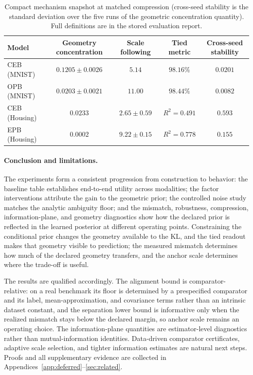 \begin{table}[t]
\centering\small
\setlength{\tabcolsep}{3pt}
\begin{tabular}{l c c c c}
\hline
Model & Geometry concentration & Scale following & Tied metric & Cross-seed stability \\
\hline
CEB (MNIST) & $0.1205\pm0.0026$ & $5.14$ & $98.16\%$ & $0.0201$ \\
OPB (MNIST) & $0.0203\pm0.0021$ & $11.00$ & $98.44\%$ & $0.0082$ \\
CEB (Housing) & $0.0233$ & $2.65\pm0.59$ & $R^2=0.491$ & $0.593$ \\
EPB (Housing) & $0.0002$ & $9.22\pm0.15$ & $R^2=0.778$ & $0.155$ \\
\hline
\end{tabular}
\caption{Compact mechanism snapshot at matched compression (cross-seed stability is
the standard deviation over the five runs of the geometric concentration
quantity). Full definitions are in the stored evaluation report.}
\label{tab:mechanism-main}
\end{table}

\paragraph{Conclusion and limitations.} The experiments form a consistent
progression from construction to behavior: the baseline table establishes end-to-end
utility across modalities; the factor interventions attribute the gain to the
geometric prior; the controlled noise study matches the analytic ambiguity floor; and
the mismatch, robustness, compression, information-plane, and geometry diagnostics
show how the declared prior is reflected in the learned posterior at different
operating points. Constraining the conditional prior changes the geometry available
to the KL, and the tied readout makes that geometry visible to prediction; the
measured mismatch determines how much of the declared geometry transfers, and the
anchor scale determines where the trade-off is useful.

The results are qualified accordingly. The alignment bound is comparator-relative: on
a real benchmark its floor is determined by a prespecified comparator and its label,
mean-approximation, and covariance terms rather than an intrinsic dataset constant,
and the separation lower bound is informative only when the realized mismatch stays
below the declared margin, so anchor scale remains an operating choice. The
information-plane quantities are estimator-level diagnostics rather than
mutual-information identities. Data-driven comparator certificates, adaptive scale
selection, and tighter information estimates are natural next steps. Proofs and all
supplementary evidence are collected in Appendices~\ref{app:deferred}--\ref{sec:related}.
